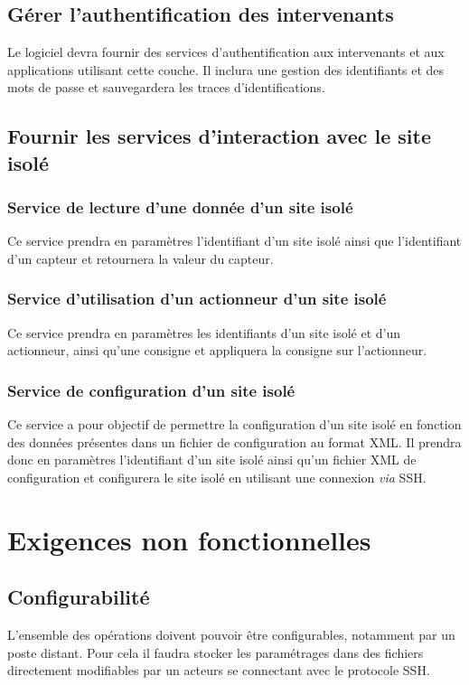 \documentclass[a4paper, 11pt, final]{article}
\begin{document}
\subsection{Gérer l'authentification des intervenants}
Le logiciel devra fournir des services d'authentification aux intervenants et aux
applications utilisant cette couche. Il inclura une gestion des identifiants et des
mots de passe et sauvegardera les traces d'identifications. 

\subsection{Fournir les services d'interaction avec le site isolé}
\subsubsection{Service de lecture d'une donnée d'un site isolé}
Ce service prendra en paramètres l'identifiant d'un site isolé ainsi que l'identifiant
d'un capteur et retournera la valeur du capteur.
\subsubsection{Service d'utilisation d'un actionneur d'un site isolé}
Ce service prendra en paramètres les identifiants d'un site isolé et d'un actionneur,
ainsi qu'une consigne et appliquera la consigne sur l'actionneur.
\subsubsection{Service de configuration d'un site isolé}
Ce service a pour objectif de permettre la configuration d'un site isolé en fonction des données
présentes dans un fichier de configuration au format XML. Il prendra donc en paramètres l'identifiant
d'un site isolé ainsi qu'un fichier XML de configuration et configurera le site isolé en utilisant une
connexion \emph{via} SSH.

\section{Exigences non fonctionnelles}

\subsection{Configurabilité}
L'ensemble des opérations doivent pouvoir être configurables, notamment par un poste distant.
Pour cela il faudra stocker les paramétrages dans des fichiers directement modifiables par un
acteurs se connectant avec le protocole SSH.
\end{document}
